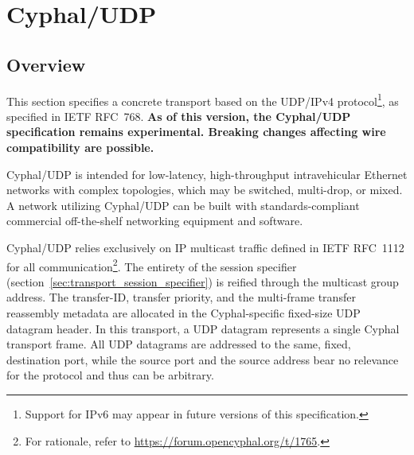 \section{Cyphal/UDP}\label{sec:transport_can}


\subsection{Overview}

This section specifies a concrete transport based on the UDP/IPv4 protocol\footnote{%
    Support for IPv6 may appear in future versions of this specification.
}, as specified in IETF RFC~768.
\textbf{
    As of this version, the Cyphal/UDP specification remains experimental.
    Breaking changes affecting wire compatibility are possible.
}

Cyphal/UDP is intended for low-latency, high-throughput intravehicular Ethernet networks with complex topologies,
which may be switched, multi-drop, or mixed.
A network utilizing Cyphal/UDP can be built with standards-compliant commercial off-the-shelf
networking equipment and software.

Cyphal/UDP relies exclusively on IP multicast traffic defined in IETF RFC~1112 for all communication\footnote{%
    For rationale, refer to \url{https://forum.opencyphal.org/t/1765}.
}.
The entirety of the session specifier (section~\ref{sec:transport_session_specifier})
is reified through the multicast group address.
The transfer-ID, transfer priority, and the multi-frame transfer reassembly metadata are allocated in the
Cyphal-specific fixed-size UDP datagram header.
In this transport, a UDP datagram represents a single Cyphal transport frame.
All UDP datagrams are addressed to the same, fixed, destination port,
while the source port and the source address bear no relevance for the protocol and thus can be arbitrary.

